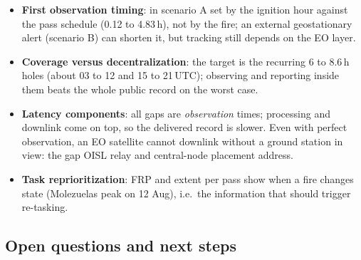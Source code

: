 \documentclass[11pt]{article}
\begin{document}
\begin{itemize}
  \item \textbf{First observation timing}: in scenario A set by the ignition hour against the pass schedule (0.12 to 4.83\,h), not by the fire; an external geostationary alert (scenario B) can shorten it, but tracking still depends on the EO layer.
  \item \textbf{Coverage versus decentralization}: the target is the recurring 6 to 8.6\,h holes (about 03 to 12 and 15 to 21\,UTC); observing and reporting inside them beats the whole public record on the worst case.
  \item \textbf{Latency components}: all gaps are \emph{observation} times; processing and downlink come on top, so the delivered record is slower. Even with perfect observation, an EO satellite cannot downlink without a ground station in view: the gap OISL relay and central-node placement address.
  \item \textbf{Task reprioritization}: FRP and extent per pass show when a fire changes state (Molezuelas peak on 12 Aug), i.e.\ the information that should trigger re-tasking.
\end{itemize}

\subsection{Open questions and next steps}
\label{subsec:baseline_next}
\end{document}

